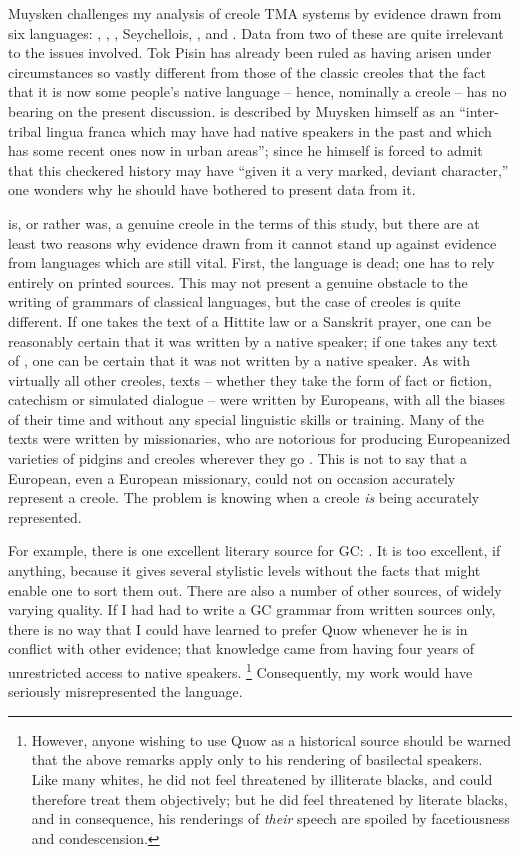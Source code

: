 Muysken challenges my analysis of creole TMA systems by evidence drawn from six languages: , , , Seychellois, , and . Data from two of these are quite irrelevant to the issues involved. Tok Pisin has already been ruled as having arisen under circumstances so vastly different from those of the classic creoles that the fact that it is now some people's %
native language -- hence, nominally a creole -- has no bearing on the present discussion.  is described by Muysken himself as an ``inter-tribal lingua franca which may have had native speakers in the past and which has some recent ones now in urban areas''; since he himself is forced to admit that this checkered history may have ``given it a very marked, deviant character,'' one wonders why he should have bothered to present data from it.

 is, or rather was, a genuine creole in the terms of this study, but there are at least two reasons why evidence drawn from it cannot stand up against evidence from languages which are still vital. First, the language is dead; one has to rely entirely on printed sources. This may not present a genuine obstacle to the writing of grammars of classical languages, but the case of creoles is quite different. If one takes the text of a Hittite law or a Sanskrit prayer, one can be reasonably certain that it was written by a native speaker; if one takes any text of , one can be certain that it was not written by a native speaker. As with virtually all other creoles, texts -- whether they take the form of fact or fiction, catechism or simulated dialogue -- were written by Europeans, with all the biases of their time and without any special linguistic skills or training. Many of the texts were written by missionaries, who are notorious for producing Europeanized varieties of pidgins and creoles wherever they go \citep{Voorhoeve1971}. This is not to say that a European, even a European missionary, could not on occasion accurately represent a creole. The problem is knowing when a creole \textit{is} being accurately represented.

For example, there is one excellent literary source for GC: \citet{Quow1877}. It is too excellent, if anything, because it gives several stylistic levels without the facts that might enable one to sort them out. There are also a number of other sources, of widely varying quality. If I had had to write a GC grammar from written sources only, there is no way that I could have learned to prefer Quow whenever he is in conflict with other evidence; that knowledge came from having four years of unrestricted access to native speakers.%
\footnote{However, anyone wishing to use Quow as a historical source should be warned that the above remarks apply only to his rendering of basilectal speakers. Like many whites, he did not feel threatened by illiterate blacks, and could therefore treat them objectively; but he did feel threatened by literate blacks, and in consequence, his ren\-derings of \textit{their} speech are spoiled by facetiousness and condescension.}
Consequently, my work would have seriously misrepresented the language.

